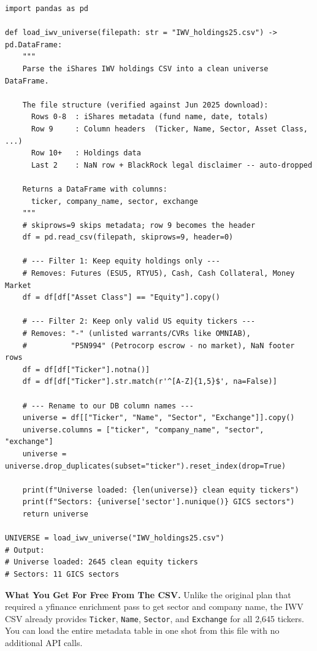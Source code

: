 \documentclass[11pt, oneside]{book}
\begin{document}
\begin{lstlisting}[style=pythonstyle, caption={Parsing IWV\_holdings25.csv into a Clean Universe DataFrame}]
import pandas as pd

def load_iwv_universe(filepath: str = "IWV_holdings25.csv") -> pd.DataFrame:
    """
    Parse the iShares IWV holdings CSV into a clean universe DataFrame.

    The file structure (verified against Jun 2025 download):
      Rows 0-8  : iShares metadata (fund name, date, totals)
      Row 9     : Column headers  (Ticker, Name, Sector, Asset Class, ...)
      Row 10+   : Holdings data
      Last 2    : NaN row + BlackRock legal disclaimer -- auto-dropped

    Returns a DataFrame with columns:
      ticker, company_name, sector, exchange
    """
    # skiprows=9 skips metadata; row 9 becomes the header
    df = pd.read_csv(filepath, skiprows=9, header=0)

    # --- Filter 1: Keep equity holdings only ---
    # Removes: Futures (ESU5, RTYU5), Cash, Cash Collateral, Money Market
    df = df[df["Asset Class"] == "Equity"].copy()

    # --- Filter 2: Keep only valid US equity tickers ---
    # Removes: "-" (unlisted warrants/CVRs like OMNIAB),
    #          "P5N994" (Petrocorp escrow - no market), NaN footer rows
    df = df[df["Ticker"].notna()]
    df = df[df["Ticker"].str.match(r'^[A-Z]{1,5}$', na=False)]

    # --- Rename to our DB column names ---
    universe = df[["Ticker", "Name", "Sector", "Exchange"]].copy()
    universe.columns = ["ticker", "company_name", "sector", "exchange"]
    universe = universe.drop_duplicates(subset="ticker").reset_index(drop=True)

    print(f"Universe loaded: {len(universe)} clean equity tickers")
    print(f"Sectors: {universe['sector'].nunique()} GICS sectors")
    return universe

UNIVERSE = load_iwv_universe("IWV_holdings25.csv")
# Output:
# Universe loaded: 2645 clean equity tickers
# Sectors: 11 GICS sectors
\end{lstlisting}

\begin{successbox}
\textbf{What You Get For Free From The CSV.} Unlike the original plan that required a yfinance enrichment pass to get sector and company name, the IWV CSV already provides \texttt{Ticker}, \texttt{Name}, \texttt{Sector}, and \texttt{Exchange} for all 2,645 tickers. You can load the entire metadata table in one shot from this file with no additional API calls.
\end{successbox}
\end{document}
